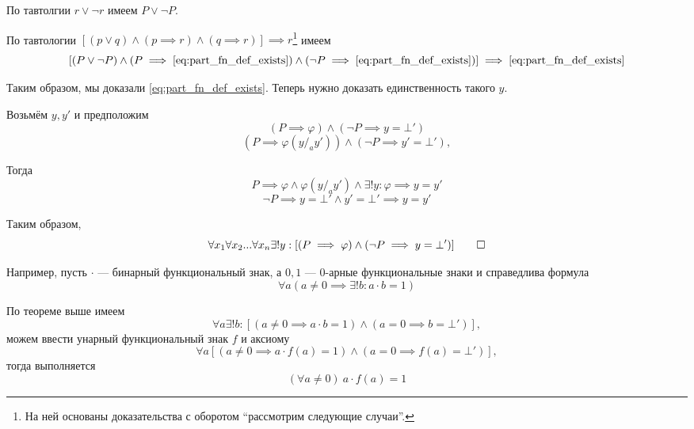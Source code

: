 По тавтолгии $r\lor\lnot r$ имеем $P\lor \lnot P$.

По тавтологии $[(p\lor q)\land (p\implies r)\land (q\implies r)]\implies r$\footnote{
	На ней основаны доказательства с оборотом ``рассмотрим следующие случаи''.
}
имеем
\[
	[(P\lor \lnot P)\land (P\implies\eqref{eq:part_fn_def_exists})\land
			(\lnot P\implies \eqref{eq:part_fn_def_exists})]
	\implies\eqref{eq:part_fn_def_exists}
\]

Таким образом, мы доказали \eqref{eq:part_fn_def_exists}.
Теперь нужно доказать единственность такого $y$.

Возьмём $y,y'$ и предположим
\[
	(P\implies \varphi)\land (\lnot P\implies y=\bot')
\]
\[
	(P\implies \varphi(y/_{a}y'))\land (\lnot P\implies y'=\bot'),
\]

Тогда
\[
	P\implies \varphi\land \varphi(y/_{a}y')\land\exists !y:\varphi\implies y=y'
\]
\[
	\lnot P\implies y=\bot'\land y'=\bot'\implies y=y'
\]

Таким образом,
\[
	\forall x_1\forall x_2...\forall x_{n}\exists !y:
	[(P\implies \varphi)\land(\lnot P\implies y=\bot')]\qed
\]

Например, пусть $\cdot$ --- бинарный функциональный знак,
а $0,1$ --- $0$-арные функциональные знаки и справедлива формула
\[
	\forall a(a\neq 0\implies \exists !b:a\cdot b=1)
\]

По теореме выше имеем
\[
	\forall a\exists !b:[(a\neq 0\implies a\cdot b=1)\land (a=0\implies b=\bot')],
\]
можем ввести унарный функциональный знак $f$ и аксиому
\[
	\forall a[(a\neq 0\implies a\cdot f(a)=1)\land (a=0\implies f(a)=\bot')],
\]
тогда выполняется
\[
	(\forall a\neq 0)~a\cdot f(a)=1
\]

